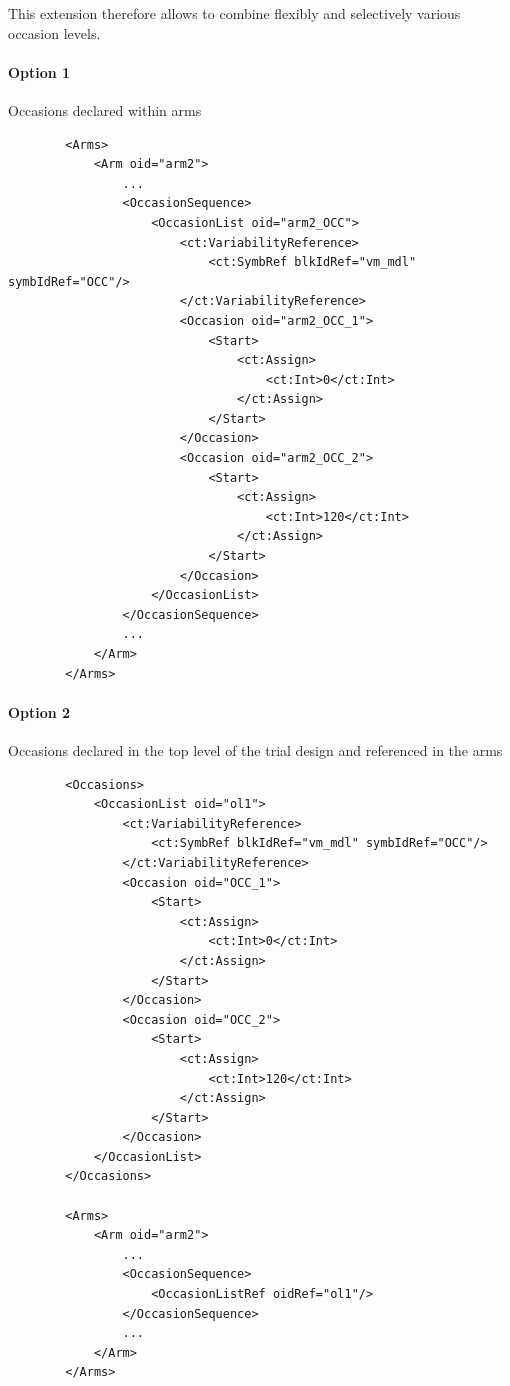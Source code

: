 This extension therefore allows to combine flexibly and selectively 
various occasion levels.

\paragraph{Option 1} Occasions declared within arms

\lstset{language=XML}
\begin{lstlisting}
        <Arms>
            <Arm oid="arm2">
                ...
                <OccasionSequence>
                    <OccasionList oid="arm2_OCC">
                        <ct:VariabilityReference>
                            <ct:SymbRef blkIdRef="vm_mdl" symbIdRef="OCC"/>
                        </ct:VariabilityReference>
                        <Occasion oid="arm2_OCC_1">
                            <Start>
                                <ct:Assign>
                                    <ct:Int>0</ct:Int>
                                </ct:Assign>
                            </Start>
                        </Occasion>
                        <Occasion oid="arm2_OCC_2">
                            <Start>
                                <ct:Assign>
                                    <ct:Int>120</ct:Int>
                                </ct:Assign>
                            </Start>
                        </Occasion>
                    </OccasionList>
                </OccasionSequence>		
                ...		
            </Arm>
        </Arms>
\end{lstlisting}
        
\paragraph{Option 2} Occasions declared in the top level of the trial 
design and referenced in the arms

\lstset{language=XML}
\begin{lstlisting}
        <Occasions>
            <OccasionList oid="ol1">
                <ct:VariabilityReference>
                    <ct:SymbRef blkIdRef="vm_mdl" symbIdRef="OCC"/>
                </ct:VariabilityReference>
                <Occasion oid="OCC_1">
                    <Start>
                        <ct:Assign>
                            <ct:Int>0</ct:Int>
                        </ct:Assign>
                    </Start>
                </Occasion>
                <Occasion oid="OCC_2">
                    <Start>
                        <ct:Assign>
                            <ct:Int>120</ct:Int>
                        </ct:Assign>
                    </Start>
                </Occasion>
            </OccasionList>
        </Occasions>
        
        <Arms>
            <Arm oid="arm2">
                ...
                <OccasionSequence>
                    <OccasionListRef oidRef="ol1"/>
                </OccasionSequence>
                ...
            </Arm>
        </Arms>
\end{lstlisting}


